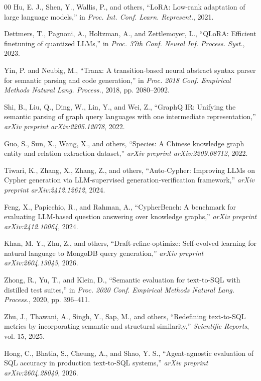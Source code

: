\documentclass[conference]{IEEEtran}
\begin{document}
\begin{thebibliography}{00}
 Hu, E. J., Shen, Y., Wallis, P., and others, ``LoRA: Low-rank adaptation of large language models,'' in \textit{Proc. Int. Conf. Learn. Represent.}, 2021.

 Dettmers, T., Pagnoni, A., Holtzman, A., and Zettlemoyer, L., ``QLoRA: Efficient finetuning of quantized LLMs,'' in \textit{Proc. 37th Conf. Neural Inf. Process. Syst.}, 2023.

 Yin, P. and Neubig, M., ``Tranx: A transition-based neural abstract syntax parser for semantic parsing and code generation,'' in \textit{Proc. 2018 Conf. Empirical Methods Natural Lang. Process.}, 2018, pp. 2080--2092.

 Shi, B., Liu, Q., Ding, W., Lin, Y., and Wei, Z., ``GraphQ IR: Unifying the semantic parsing of graph query languages with one intermediate representation,'' \textit{arXiv preprint arXiv:2205.12078}, 2022.

 Guo, S., Sun, X., Wang, X., and others, ``Species: A Chinese knowledge graph entity and relation extraction dataset,'' \textit{arXiv preprint arXiv:2209.08712}, 2022.

 Tiwari, K., Zhang, X., Zhang, Z., and others, ``Auto-Cypher: Improving LLMs on Cypher generation via LLM-supervised generation-verification framework,'' \textit{arXiv preprint arXiv:2412.12612}, 2024.

 Feng, X., Papicchio, R., and Rahman, A., ``CypherBench: A benchmark for evaluating LLM-based question answering over knowledge graphs,'' \textit{arXiv preprint arXiv:2412.10064}, 2024.

 Khan, M. Y., Zhu, Z., and others, ``Draft-refine-optimize: Self-evolved learning for natural language to MongoDB query generation,'' \textit{arXiv preprint arXiv:2604.13045}, 2026.

 Zhong, R., Yu, T., and Klein, D., ``Semantic evaluation for text-to-SQL with distilled test suites,'' in \textit{Proc. 2020 Conf. Empirical Methods Natural Lang. Process.}, 2020, pp. 396--411.

 Zhu, J., Thawani, A., Singh, Y., Sap, M., and others, ``Redefining text-to-SQL metrics by incorporating semantic and structural similarity,'' \textit{Scientific Reports}, vol. 15, 2025.

 Hong, C., Bhatia, S., Cheung, A., and Shao, Y. S., ``Agent-agnostic evaluation of SQL accuracy in production text-to-SQL systems,'' \textit{arXiv preprint arXiv:2604.28049}, 2026.

\end{thebibliography}
\end{document}
